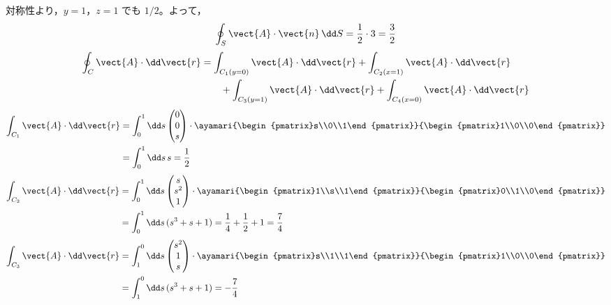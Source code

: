 対称性より，$y=1$，$z=1$ でも $1/2$。よって，
\[ \oint_{S}\vect{A}\cdot\vect{n}\,\dd S=\frac{1}{2}\cdot 3=\frac{3}{2} \]
\begin{align*}
\oint_{C}\vect{A}\cdot\dd\vect{r}&=\int_{C_{1}(y=0)}\vect{A}\cdot\dd\vect{r}+\int_{C_{2}(x=1)}\vect{A}\cdot\dd\vect{r}\\
&\qquad+\int_{C_{3}(y=1)}\vect{A}\cdot\dd\vect{r}+\int_{C_{4}(x=0)}\vect{A}\cdot\dd\vect{r}
\end{align*}
\begin{align*}
\int_{C_{1}}\vect{A}\cdot\dd\vect{r}&=\int_{0}^{1}\dd s\begin{pmatrix}0\\0\\s\end{pmatrix}\cdot\ayamari{\begin{pmatrix}s\\0\\1\end{pmatrix}}{\begin{pmatrix}1\\0\\0\end{pmatrix}}\\
&=\int_{0}^{1}\dd s\,s=\frac{1}{2}
\end{align*}
\begin{align*}
\int_{C_{2}}\vect{A}\cdot\dd\vect{r}&=\int_{0}^{1}\dd s\begin{pmatrix}s\\s^{2}\\1\end{pmatrix}\cdot\ayamari{\begin{pmatrix}1\\s\\1\end{pmatrix}}{\begin{pmatrix}0\\1\\0\end{pmatrix}}\\
&=\int_{0}^{1}\dd s\,(s^{3}+s+1)=\frac{1}{4}+\frac{1}{2}+1=\frac{7}{4}
\end{align*}
\begin{align*}
\int_{C_{3}}\vect{A}\cdot\dd\vect{r}&=\int_{1}^{0}\dd s\begin{pmatrix}s^{2}\\1\\s\end{pmatrix}\cdot\ayamari{\begin{pmatrix}s\\1\\1\end{pmatrix}}{\begin{pmatrix}1\\0\\0\end{pmatrix}}\\
&=\int_{1}^{0}\dd s\,(s^{3}+s+1)=-\frac{7}{4}
\end{align*}
